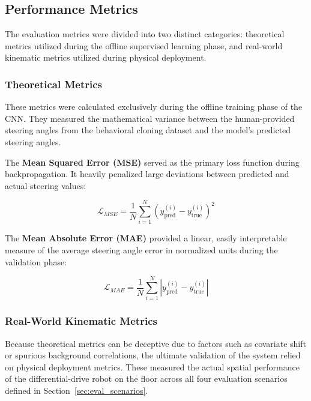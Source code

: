 \subsection{Performance Metrics}
\label{sec:performance_metrics}

The evaluation metrics were divided into two distinct categories: theoretical metrics utilized
during the offline supervised learning phase, and real-world kinematic metrics utilized during
physical deployment.

\subsubsection{Theoretical Metrics}

These metrics were calculated exclusively during the offline training phase of the CNN. They
measured the mathematical variance between the human-provided steering angles from the
behavioral cloning dataset and the model's predicted steering angles.

The \textbf{Mean Squared Error (MSE)} served as the primary loss function during
backpropagation. It heavily penalized large deviations between predicted and actual steering
values:

\begin{equation}
    \mathcal{L}_{MSE} = \frac{1}{N} \sum_{i=1}^{N}
    \left( y^{(i)}_{\text{pred}} - y^{(i)}_{\text{true}} \right)^2
    \label{eq:mse}
\end{equation}

The \textbf{Mean Absolute Error (MAE)} provided a linear, easily interpretable measure of
the average steering angle error in normalized units during the validation phase:

\begin{equation}
    \mathcal{L}_{MAE} = \frac{1}{N} \sum_{i=1}^{N}
    \left| y^{(i)}_{\text{pred}} - y^{(i)}_{\text{true}} \right|
    \label{eq:mae}
\end{equation}

\subsubsection{Real-World Kinematic Metrics}

Because theoretical metrics can be deceptive due to factors such as covariate shift or
spurious background correlations, the ultimate validation of the system relied on physical
deployment metrics. These measured the actual spatial performance of the differential-drive
robot on the floor across all four evaluation scenarios defined in
Section~\ref{sec:eval_scenarios}.

